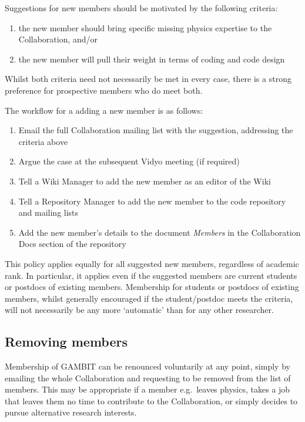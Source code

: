 Suggestions for new members should be motivated by the following criteria:
\begin{enumerate}
\item the new member should bring specific missing physics expertise to the Collaboration, and/or
\item the new member will pull their weight in terms of coding and code design
\end{enumerate}
Whilst both criteria need not necessarily be met in every case, there is a strong preference for prospective members who do meet both.  

The workflow for a adding a new member is as follows:
\begin{enumerate}
\item Email the full Collaboration mailing list with the suggestion, addressing the criteria above
\item Argue the case at the subsequent Vidyo meeting (if required)
\item Tell a Wiki Manager to add the new member as an editor of the Wiki
\item Tell a Repository Manager to add the new member to the code repository and mailing lists
\item Add the new member's details to the document \textit{Members} in the Collaboration Docs section of the repository
\end{enumerate}

This policy applies equally for all suggested new members, regardless of academic rank.  In particular, it applies even if the suggested members are current students or postdocs of existing members.  Membership for students or postdocs of existing members, whilst generally encouraged if the student/postdoc meets the criteria, will not necessarily be any more `automatic' than for any other researcher.

\subsection{Removing members}

Membership of GAMBIT can be renounced voluntarily at any point, simply by emailing the whole Collaboration and requesting to be removed from the list of members.  This may be appropriate if a member e.g.\ leaves physics, takes a job that leaves them no time to contribute to the Collaboration, or simply decides to pursue alternative research interests.

